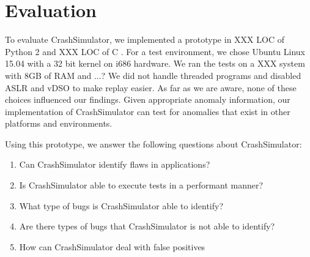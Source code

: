 \section{Evaluation}


To evaluate CrashSimulator, we implemented a prototype in XXX LOC of Python 2 
and XXX LOC of C .  For a test
environment, we chose Ubuntu Linux 15.04 with a 32 bit kernel on i686 hardware.
We ran the tests on a XXX system with 8GB of RAM and ...?   
We did not handle threaded programs and disabled ASLR and vDSO to make replay 
easier.  As far as we are aware, none of these choices influenced our findings.
Given appropriate anomaly information, our implementation of CrashSimulator can
test for anomalies that exist in other platforms and environments.  


Using this prototype, we answer the following questions about CrashSimulator:

\begin{enumerate}
   \item{Can CrashSimulator identify flaws in applications?}
   \item{Is CrashSimulator able to execute tests in a performant manner?}
   \item{What type of bugs is CrashSimulator able to identify?}
   \item{Are there types of bugs that CrashSimulator is not able to identify?}
   \item{How can CrashSimulator deal with false positives}
\end{enumerate}





